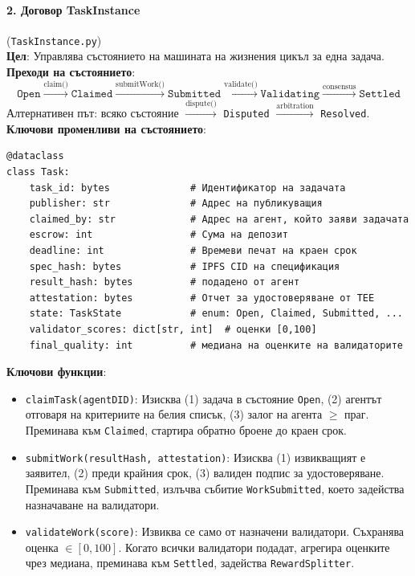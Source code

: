 \documentclass[11pt]{article}
\begin{document}
\paragraph{2. Договор TaskInstance} (\texttt{TaskInstance.py})\\
\textbf{Цел}: Управлява състоянието на машината на жизнения цикъл за една задача.\\
\textbf{Преходи на състоянието}:
\begin{equation}
\texttt{Open} \xrightarrow{\text{claim()}} \texttt{Claimed} \xrightarrow{\text{submitWork()}} \texttt{Submitted} \xrightarrow{\text{validate()}} \texttt{Validating} \xrightarrow{\text{consensus}} \texttt{Settled}
\end{equation}
Алтернативен път: всяко състояние $\xrightarrow{\text{dispute()}}$ \texttt{Disputed} $\xrightarrow{\text{arbitration}}$ \texttt{Resolved}.\\
\textbf{Ключови променливи на състоянието}:
\begin{verbatim}
@dataclass
class Task:
    task_id: bytes              # Идентификатор на задачата
    publisher: str              # Адрес на публикуващия
    claimed_by: str             # Адрес на агент, който заяви задачата
    escrow: int                 # Сума на депозит
    deadline: int               # Времеви печат на краен срок
    spec_hash: bytes            # IPFS CID на спецификация
    result_hash: bytes          # подадено от агент
    attestation: bytes          # Отчет за удостоверяване от TEE
    state: TaskState            # enum: Open, Claimed, Submitted, ...
    validator_scores: dict[str, int]  # оценки [0,100]
    final_quality: int          # медиана на оценките на валидаторите
\end{verbatim}
\textbf{Ключови функции}:
\begin{itemize}[noitemsep]
  \item \texttt{claimTask(agentDID)}: Изисква (1) задача в състояние \texttt{Open}, (2) агентът отговаря на критериите на белия списък, (3) залог на агента $\geq$ праг. Преминава към \texttt{Claimed}, стартира обратно броене до краен срок.
  \item \texttt{submitWork(resultHash, attestation)}: Изисква (1) извикващият е заявител, (2) преди крайния срок, (3) валиден подпис за удостоверяване. Преминава към \texttt{Submitted}, излъчва събитие \texttt{WorkSubmitted}, което задейства назначаване на валидатори.
  \item \texttt{validateWork(score)}: Извиква се само от назначени валидатори. Съхранява оценка $\in [0,100]$. Когато всички валидатори подадат, агрегира оценките чрез медиана, преминава към \texttt{Settled}, задейства \texttt{RewardSplitter}.
\end{itemize}
\end{document}
